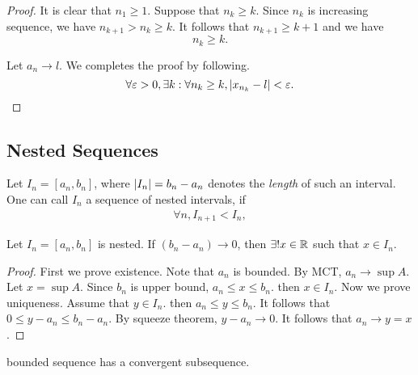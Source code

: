 \begin{proof}
  It is clear that $n_1 \ge 1$. Suppose that $n_k
    \ge k$. Since $n_k$ is increasing sequence, we have $n_{k+1} > n_k \ge k$. It
  follows that $n_{k+1} \ge k + 1$ and we have
  \begin{equation}
    n_k \ge k.
  \end{equation}

  Let $a_n \to l$. We completes the proof by following.
  \begin{equation}
    \forall \varepsilon > 0, \exists k: \forall n_k \ge k, \left| x_{n_k} - l \right| < \varepsilon.
  \end{equation}
\end{proof}


\subsection{Nested Sequences}

\begin{definition}
  Let $I_n = [a_n, b_n]$, where $\left| I_n \right| = b_n - a_n$ denotes the
  \emph{length} of such an interval. One can call $I_n$ a sequence of nested
  intervals, if
  \begin{equation}
    \begin{split}
      \forall n, I_{n + 1} < I_n,
    \end{split}
  \end{equation}
  \label{def:nest}
\end{definition}

\begin{theorem} 
  Let $I_n = [a_n, b_n]$ is nested. If $(b_n - a_n) \to 0$, then $\exists! x \in
    \mathbb{R}$ such that $x \in I_n$.
  \label{thm:nest_int}
\end{theorem}

\begin{proof}
  First we prove existence. Note that $a_n$ is bounded. By MCT, $a_n \to \sup
    A$. Let $x = \sup A$. Since $b_n$ is upper bound, $a_n \le x \le b_n$. then $x
    \in I_n$. Now we prove uniqueness. Assume that $y \in I_n$. then $a_n \le y
    \le b_n$. It follows that $0 \le y - a_n \le b_n - a_n$. By squeeze theorem,
  $y - a_n \to 0$. It follows that $a_n \to y = x$.
\end{proof}

\begin{theorem} 
  bounded sequence has a convergent subsequence.
  \label{thm:nest_bol}
\end{theorem}

